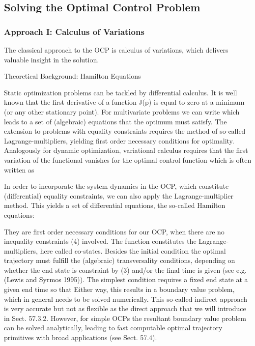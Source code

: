 \subsection{Solving the Optimal Control Problem}

\subsubsection{Approach I: Calculus of Variations}
The classical approach to the OCP is calculus of variations, which delivers valuable insight in the solution. 

Theoretical Background: Hamilton Equations

Static optimization problems can be tackled by differential calculus. It is well known that the first derivative of a function J(p) is equal to zero at a minimum (or any other stationary point). For multivariate problems we can write 
which leads to a set of (algebraic) equations that the optimum 
must satisfy. The extension to problems with equality constraints requires the method of so-called Lagrange-multipliers, yielding first order necessary conditions for optimality.
Analogously for dynamic optimization, variational calculus requires that the first variation of the functional %
vanishes for the optimal control function %
which is often written as 

In order to incorporate the system dynamics in the OCP, which constitute (differential) equality constraints, we can also apply the Lagrange-multiplier method. This yields a set of differential equations, the so-called Hamilton equations:


They are first order necessary conditions for our OCP, when there are no inequality constraints (4) involved. The function 
constitutes the Lagrange-multipliers, here called co-states. Besides the initial condition
the optimal trajectory must fulfill the (algebraic) transversality conditions, depending on whether the end state 
is constraint by (3) and/or the final time 
is given (see e.g. (Lewis and Syrmos 1995)). The simplest condition requires a fixed end state 
at a given end time 
so that
Either way, this results in a boundary value problem, which in general needs to be solved numerically. This so-called indirect approach is very accurate but not as flexible as the direct approach that we will introduce in Sect. 57.3.2. However, for simple OCPs the resultant boundary value problem can be solved analytically, leading to fast computable optimal trajectory primitives with broad applications (see Sect. 57.4).

